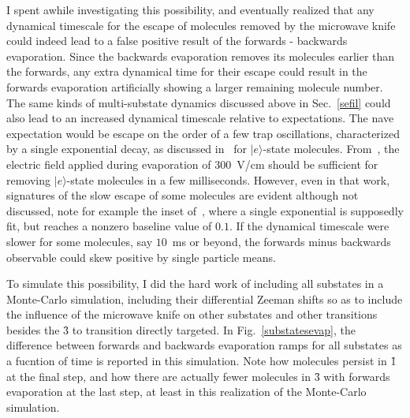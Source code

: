 I spent awhile investigating this possibility, and eventually realized that any dynamical timescale for the escape of molecules removed by the microwave knife could indeed lead to a false positive result of the forwards - backwards evaporation. 
Since the backwards evaporation removes its molecules earlier than the forwards, any extra dynamical time for their escape could result in the forwards evaporation artificially showing a larger remaining molecule number.
The same kinds of multi-substate dynamics discussed above in Sec.~\ref{sefil} could also lead to an increased dynamical timescale relative to expectations.
The nave expectation would be escape on the order of a few trap oscillations, characterized by a single exponential decay, as discussed in~\cite{Stuhl2012uwave} for $|e\rangle$-state molecules.
From~\citep[Fig.~4]{Stuhl2012uwave}, the electric field applied during evaporation of $300$~V/cm should be sufficient for removing $|e\rangle$-state molecules in a few milliseconds.
However, even in that work, signatures of the slow escape of some molecules are evident although not discussed, note for example the inset of~\citep[Fig.~3]{Stuhl2012uwave}, where a single exponential is supposedly fit, but reaches a nonzero baseline value of $0.1$.
If the dynamical timescale were slower for some molecules, say $10$~ms or beyond, the forwards minus backwards observable could skew positive by single particle means.

To simulate this possibility, I did the hard work of including all substates in a Monte-Carlo simulation, including their differential Zeeman shifts so as to include the influence of the microwave knife on other substates and other transitions besides the \f3 to  transition directly targeted.
In Fig.~\ref{substatesevap}, the difference between forwards and backwards evaporation ramps for all substates as a fucntion of time is reported in this simulation.
Note how molecules persist in \f1 at the final step, and how there are actually fewer molecules in \f3 with forwards evaporation at the last step, at least in this realization of the Monte-Carlo simulation.

